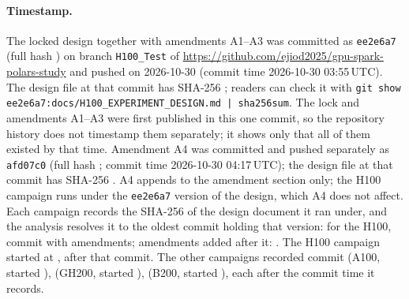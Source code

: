 \documentclass[11pt]{article}
\begin{document}
\paragraph{Timestamp.} The locked design together with amendments A1--A3 was
committed as \texttt{ee2e6a7} (full hash
\texttt{}) on branch
\texttt{H100\_Test} of
\url{https://github.com/ejiod2025/gpu-spark-polars-study} and pushed on
2026-10-30 (commit time 2026-10-30 03:55\,UTC). The design file at that commit
has SHA-256
\texttt{};
readers can check it with \texttt{git show
ee2e6a7:docs/H100\_EXPERIMENT\_DESIGN.md | sha256sum}. The lock and
amendments A1--A3 were first published in this one commit, so the repository
history does not timestamp them separately; it shows only that all of them
existed by that time. Amendment A4 was committed and pushed separately as
\texttt{afd07c0} (full hash
\texttt{}; commit time 2026-10-30
04:17\,UTC); the design file at that commit has SHA-256
\texttt{}.
A4 appends to the amendment section only; the H100 campaign runs under the
\texttt{ee2e6a7} version of the design, which A4 does not affect. Each
campaign records the SHA-256 of the design document it ran under, and the
analysis resolves it to the oldest commit holding that version: for the H100,
commit \texttt{} with 
amendments; amendments added after it: . The
H100 campaign started at , after that commit.
\ifladderran
The other campaigns recorded commit
\ifaonehundredran
\texttt{} (A100, started
),
\fi
\ifghtwohundredran
\texttt{} (GH200, started
),
\fi
\ifbtwohundredran
\texttt{} (B200, started
),
\fi
each after the commit time it records.
\fi
\end{document}
